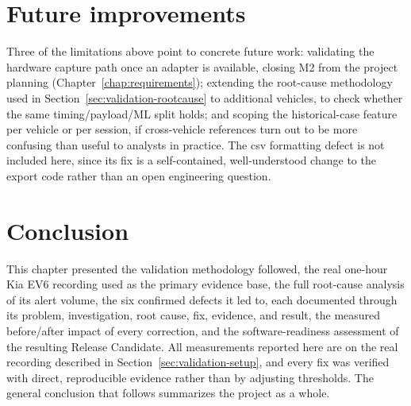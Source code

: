 \section{Future improvements}

Three of the limitations above point to concrete future work: validating the hardware capture path once an adapter is available, closing M2 from the project planning (Chapter~\ref{chap:requirements}); extending the root-cause methodology used in Section~\ref{sec:validation-rootcause} to additional vehicles, to check whether the same timing/payload/ML split holds; and scoping the historical-case feature per vehicle or per session, if cross-vehicle references turn out to be more confusing than useful to analysts in practice. The \gls{csv} formatting defect is not included here, since its fix is a self-contained, well-understood change to the export code rather than an open engineering question.

\section{Conclusion}

This chapter presented the validation methodology followed, the real one-hour Kia EV6 recording used as the primary evidence base, the full root-cause analysis of its alert volume, the six confirmed defects it led to, each documented through its problem, investigation, root cause, fix, evidence, and result, the measured before/after impact of every correction, and the software-readiness assessment of the resulting Release Candidate. All measurements reported here are on the real recording described in Section~\ref{sec:validation-setup}, and every fix was verified with direct, reproducible evidence rather than by adjusting thresholds. The general conclusion that follows summarizes the project as a whole.
